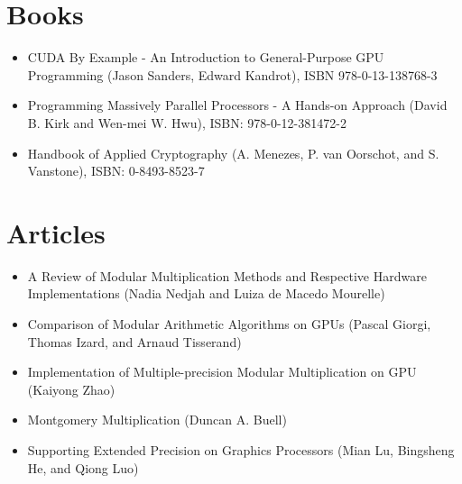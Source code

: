 \documentclass[12pt, a4paper]{report}
\begin{document}
\begin{sloppypar}
\section{Books}
\begin{itemize}
\item CUDA By Example - An Introduction to General-Purpose GPU Programming
(Jason Sanders, Edward Kandrot), ISBN 978-0-13-138768-3
\item Programming Massively Parallel Processors - A Hands-on Approach (David B. Kirk and Wen-mei W. Hwu), ISBN: 978-0-12-381472-2
\item Handbook of Applied Cryptography (A. Menezes, P. van Oorschot, and S. Vanstone), ISBN: 0-8493-8523-7
\end{itemize}

\section{Articles}
\begin{itemize}
\item A Review of Modular Multiplication Methods and Respective Hardware Implementations (Nadia Nedjah and Luiza de Macedo Mourelle)
\item{Comparison of Modular Arithmetic Algorithms on GPUs (Pascal Giorgi, Thomas Izard, and Arnaud Tisserand)}
\item{Implementation of Multiple-precision Modular Multiplication on GPU (Kaiyong Zhao)}
\item{Montgomery Multiplication (Duncan A. Buell)}
\item{Supporting Extended Precision on Graphics Processors (Mian Lu, Bingsheng He, and Qiong Luo)}
\end{itemize}

\end{sloppypar}
\end{document}
